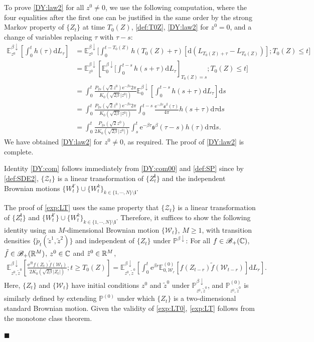 \documentclass[12pt, twoside]{article}
\numberwithin{figure}{section}
\newcommand{\e}{{\mathrm e}}
\newcommand{\1}{\mathds 1}
\newcommand{\B}{\mathscr B}
\newcommand{\da}{{\downarrow}}
\newcommand{\ms}{\mathscr}
\renewcommand{\P}{{\mathbb P}}
\newcommand{\E}{{\mathbb E}}
\newcommand{\mc}{\mathcal}
\renewcommand{\d}{{\mathrm d}}
\newcommand{\R}{{\Bbb R}}
\newcommand{\2}{{\mathbf 1}}
\newcommand{\s}{{\mathfrak s}}
\renewenvironment{proof}[1][\proofname]{\noindent {\bfseries #1.}\;}{\hfill\ensuremath{\blacksquare}\\}
\newcommand{\cc}{{^\circ}}
\newcommand{\bi}{\mathbf i}
\newcommand{\two}{{\sqrt{2}}}
\begin{document}
\begin{proof}[Proof of Theorem~\ref{thm:formulas}]
To prove  \eqref{DY:law2} for all $z^0\neq 0$, we use the following computation, where the four equalities after the first one can be justified in the same order by the strong Markov property of $\{Z_t\}$ at time $T_0(Z)$, \eqref{def:T0Z},  \eqref{DY:law2} for $z^0=0$, and a change of variables replacing $\tau$ with $\tau-s$:
\begin{align*}
\E^{\beta\da}_{z^0}\left[\int_0^t h(\tau)\d L_\tau\right]
&=\E^{\beta\da}_{z^0}\biggl[\int_{0}^{t-T_0(Z)}h(T_0(Z)+\tau) [\d( L_{T_0(Z)+\tau}-L_{T_0(Z)})];T_0(Z)\leq t\biggr]\\
&=\E^{\beta\da}_{z^0}\left[\E^{\beta\da}_{0}\biggl[\int_0^{t-s} h(s+\tau)\d L_\tau\right]_{T_0(Z)=s};T_0(Z)\leq t\biggr]\\
&=\int_0^t \frac{ P_{2s}(\two z^0)\e^{-\beta s}2\pi}{K_0(\sqrt{2\beta}|z^0|)}
\E_0^{\beta\da}\left[\int_0^{t-s}h(s+\tau)\d L_{\tau}\right]\d s\\
&=\int_0^t\frac{ P_{2s}(\two z^0)\e^{-\beta s}2\pi}{K_0(\sqrt{2\beta}|z^0|)}\int_0^{t-s} \frac{\e^{-\beta \tau}\s^\beta(\tau)}{4\pi}h(s+\tau)\d \tau\d s\\
&=\int_0^t \frac{P_{2s}(\two z^0)}{2K_0(\sqrt{2\beta}|z^0|)}
\int_{s}^{t}  \e^{-\beta \tau}\s^\beta(\tau-s)h(\tau)\d \tau\d s.
\end{align*}
We have obtained \eqref{DY:law2} for $z^0\neq 0$, as required. 
The proof of  \eqref{DY:law2} is complete. \smallskip

\noindent {\bf (4$\cc$)} Identity \eqref{DY:com} follows immediately from \eqref{DY:com00} and \eqref{def:SP} since by \eqref{def:SDE2}, $\{\ms Z_t\}$ is a linear transformation of $\{Z^\bi_t\}$ and the independent Brownian motions $\{W^{\bi\prime}_t\}\cup \{W^k_t\}_{k\in \{1,\cdots,N\}\setminus\bi}$.

The proof of \eqref{exp:LT} uses the same property that $\{\ms Z_t\}$ is a linear transformation of $\{Z^\bi_t\}$ and $\{W^{\bi\prime}_t\}\cup \{W^k_t\}_{k\in \{1,\cdots,N\}\setminus\bi}$.
Therefore, it suffices to show the following identity using an $M$-dimensional Brownian motion $\{\mc W_t\}$, $M\geq 1$, with transition densities $\{\tilde{p}_t(\tilde{z}^1,\tilde{z}^2)\}$ and independent of $\{Z_t\}$ under $\P^{\beta\da}$:  For all $f\in \B_+(\Bbb C)$, $\tilde{f}\in \B_+(\R^{M})$, $z^0\in \Bbb C$ and $\tilde{z}^0\in \R^M$,
\begin{align}\label{exp:LT0}
\E^{\beta\da}_{z^0,\tilde{z}^0}\left[\frac{\e^{\beta t}f(Z_t)\tilde{f}(\mc W_t)}{2K_0(\sqrt{2\beta}|Z_t|)};t\geq T_0(Z)\right]=\E^{\beta\da }_{z^0,\tilde{z}^0}\left[\int_0^t\e^{\beta r}\E^{(0)}_{0,\mc W_{ r}}[f(Z_{t- r})\tilde{f}(\mc W_{t- r})] \d L_ r\right].
\end{align}
Here, $\{Z_t\}$ and $\{\mc W_t\}$ have initial conditions $z^0$ and $\tilde{z}^0$ under $\P^{\beta\da}_{z^0,\tilde{z}^0}$, and $\P^{(0)}_{z^0,\tilde{z}^0}$ is similarly defined by extending $\P^{(0)}$ under which $\{Z_t\}$ is a two-dimensional standard Brownian motion. Given the validity of \eqref{exp:LT0}, \eqref{exp:LT} follows from the monotone class theorem.
 

\end{proof}
\end{document}
